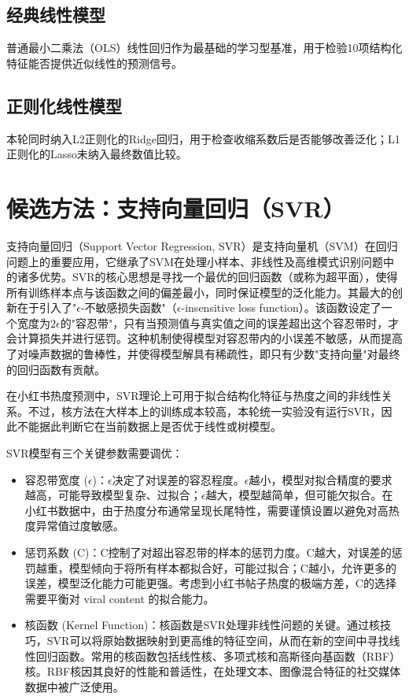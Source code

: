 \subsection{经典线性模型}
普通最小二乘法（OLS）线性回归作为最基础的学习型基准，用于检验10项结构化特征能否提供近似线性的预测信号。

\subsection{正则化线性模型}
本轮同时纳入L2正则化的Ridge回归，用于检查收缩系数后是否能够改善泛化；L1正则化的Lasso未纳入最终数值比较。

\section{候选方法：支持向量回归（SVR）}

支持向量回归（Support Vector Regression, SVR）是支持向量机（SVM）在回归问题上的重要应用，它继承了SVM在处理小样本、非线性及高维模式识别问题中的诸多优势。SVR的核心思想是寻找一个最优的回归函数（或称为超平面），使得所有训练样本点与该函数之间的偏差最小，同时保证模型的泛化能力。其最大的创新在于引入了"$\epsilon$-不敏感损失函数"（$\epsilon$-insensitive loss function）。该函数设定了一个宽度为$2\epsilon$的"容忍带"，只有当预测值与真实值之间的误差超出这个容忍带时，才会计算损失并进行惩罚。这种机制使得模型对容忍带内的小误差不敏感，从而提高了对噪声数据的鲁棒性，并使得模型解具有稀疏性，即只有少数"支持向量"对最终的回归函数有贡献。

在小红书热度预测中，SVR理论上可用于拟合结构化特征与热度之间的非线性关系。不过，核方法在大样本上的训练成本较高，本轮统一实验没有运行SVR，因此不能据此判断它在当前数据上是否优于线性或树模型。

SVR模型有三个关键参数需要调优：
\begin{itemize}
	\item 容忍带宽度 ($\epsilon$)：$\epsilon$决定了对误差的容忍程度。$\epsilon$越小，模型对拟合精度的要求越高，可能导致模型复杂、过拟合；$\epsilon$越大，模型越简单，但可能欠拟合。在小红书数据中，由于热度分布通常呈现长尾特性，需要谨慎设置以避免对高热度异常值过度敏感。
	\item 惩罚系数 (C)：C控制了对超出容忍带的样本的惩罚力度。C越大，对误差的惩罚越重，模型倾向于将所有样本都拟合好，可能过拟合；C越小，允许更多的误差，模型泛化能力可能更强。考虑到小红书帖子热度的极端方差，C的选择需要平衡对 viral content 的拟合能力。
	\item 核函数 (Kernel Function)：核函数是SVR处理非线性问题的关键。通过核技巧，SVR可以将原始数据映射到更高维的特征空间，从而在新的空间中寻找线性回归函数。常用的核函数包括线性核、多项式核和高斯径向基函数（RBF）核。RBF核因其良好的性能和普适性，在处理文本、图像混合特征的社交媒体数据中被广泛使用。
\end{itemize}

